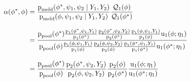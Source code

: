 \begin{align}
 \alpha(\phi^{*}, \phi) 
  &= 
    \frac {
      \text{p}_{\text{meld}}(\phi^{*}, \psi_{1}, \psi_{2} \mid Y_{1}, Y_{2})
    } {
      \text{p}_{\text{meld}}(\phi, \psi_{1}, \psi_{2} \mid Y_{1}, Y_{2})
    }
    \frac {
      \mathcal{Q}_{1}(\phi)
    } {
      \mathcal{Q}_{1}(\phi^{*})
    } \\[2ex]
  &=
    \frac {
      \text{p}_{\text{pool}}(\phi^{*})
      \frac {
        \text{p}_{1}(\phi^{*}, \psi_1, Y_{1})
      } {
        \text{p}_{1}(\phi^{*})
      }
      \frac {
        \text{p}_{2}(\phi^{*}, \psi_2, Y_{2})
      } {
        \text{p}_{2}(\phi^{*})
      }
      \frac {
        \text{p}_{1}(\phi, \psi_1, Y_{1})
      } {
        \text{p}_{1}(\phi)
      }
      \text{u}_{1}(\phi; \eta_{1})
    } {
      \text{p}_{\text{pool}}(\phi)
      \frac {
        \text{p}_{1}(\phi, \psi_1, Y_{1})
      } {
        \text{p}_{1}(\phi)
      }
      \frac {
        \text{p}_{2}(\phi, \psi_2, Y_{2})
      } {
        \text{p}_{2}(\phi)
      }
      \frac {
        \text{p}_{1}(\phi^{*}, \psi_1, Y_{1})
      } {
        \text{p}_{1}(\phi^{*})
      }
      \text{u}_{1}(\phi^{*}; \eta_{1})
    } \\[2ex]
  &= 
    \frac{
      \text{p}_{\text{pool}} (\phi^{*})
    } {
      \text{p}_{\text{pool}} (\phi)
    }
    \frac {
      \text{p}_{2}(\phi^{*}, \psi_2, Y_{2})
    } {
      \text{p}_{2}(\phi, \psi_2, Y_{2})
    }
    \frac {
      \text{p}_{2}(\phi)
    } {
      \text{p}_{2}(\phi^{*})
    }
    \frac {
      \text{u}_{1}(\phi; \eta_{1})
    } {
      \text{u}_{1}(\phi^{*}; \eta_{1})
    }
  \label{eqn:stage-two-acceptance}
\end{align}